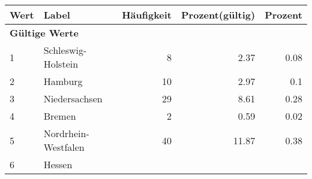      \begin{longtable}{lXrrr}
     \toprule
     \textbf{Wert} & \textbf{Label} & \textbf{Häufigkeit} & \textbf{Prozent(gültig)} & \textbf{Prozent} \\
     \endhead
     \midrule
     \multicolumn{5}{l}{\textbf{Gültige Werte}}\\

     1 &
     \multicolumn{1}{X}{ Schleswig-Holstein   } &


       \num{8} &
       \num[round-mode=places,round-precision=2]{2.37} &
         \num[round-mode=places,round-precision=2]{0.08} \\

     2 &
     \multicolumn{1}{X}{ Hamburg   } &


       \num{10} &
       \num[round-mode=places,round-precision=2]{2.97} &
         \num[round-mode=places,round-precision=2]{0.1} \\

     3 &
     \multicolumn{1}{X}{ Niedersachsen   } &


       \num{29} &
       \num[round-mode=places,round-precision=2]{8.61} &
         \num[round-mode=places,round-precision=2]{0.28} \\

     4 &
     \multicolumn{1}{X}{ Bremen   } &


       \num{2} &
       \num[round-mode=places,round-precision=2]{0.59} &
         \num[round-mode=places,round-precision=2]{0.02} \\

     5 &
     \multicolumn{1}{X}{ Nordrhein-Westfalen   } &


       \num{40} &
       \num[round-mode=places,round-precision=2]{11.87} &
         \num[round-mode=places,round-precision=2]{0.38} \\

     6 &
     \multicolumn{1}{X}{ Hessen   } &



\end{longtable}
